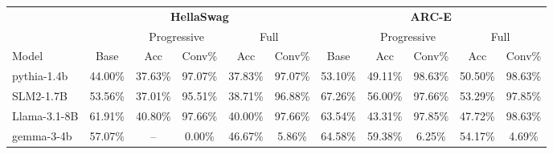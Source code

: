 \begin{tabular}{lcccccccccc}
\toprule
 & \multicolumn{5}{c}{\textbf{HellaSwag}} & \multicolumn{5}{c}{\textbf{ARC-E}} \\
\cmidrule(lr){2-6}\cmidrule(lr){7-11}
 & & \multicolumn{2}{c}{Progressive} & \multicolumn{2}{c}{Full} & & \multicolumn{2}{c}{Progressive} & \multicolumn{2}{c}{Full} \\
\cmidrule(lr){3-4}\cmidrule(lr){5-6}\cmidrule(lr){8-9}\cmidrule(lr){10-11}
 Model               & Base            & Acc             & Conv\%           & Acc             & Conv\%           & Base            & Acc             & Conv\%           & Acc             & Conv\%           \\
\midrule
 \small pythia-1.4b  & 44.00{\small \%} & 37.63{\small \%} & 97.07{\small \%} & 37.83{\small \%} & 97.07{\small \%} & 53.10{\small \%} & 49.11{\small \%} & 98.63{\small \%} & 50.50{\small \%} & 98.63{\small \%} \\
 \small SLM2-1.7B    & 53.56{\small \%} & 37.01{\small \%} & 95.51{\small \%} & 38.71{\small \%} & 96.88{\small \%} & 67.26{\small \%} & 56.00{\small \%} & 97.66{\small \%} & 53.29{\small \%} & 97.85{\small \%} \\
 \small Llama-3.1-8B & 61.91{\small \%} & 40.80{\small \%} & 97.66{\small \%} & 40.00{\small \%} & 97.66{\small \%} & 63.54{\small \%} & 43.31{\small \%} & 97.85{\small \%} & 47.72{\small \%} & 98.63{\small \%} \\
 \small gemma-3-4b   & 57.07{\small \%} & --              & 0.00{\small \%}  & 46.67{\small \%} & 5.86{\small \%}  & 64.58{\small \%} & 59.38{\small \%} & 6.25{\small \%}  & 54.17{\small \%} & 4.69{\small \%}  \\
\bottomrule
\end{tabular}
